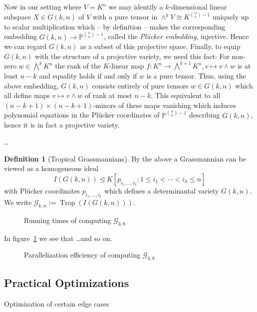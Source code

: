 \documentclass[
  paper=a4,
  DIV=14,
  fontsize=12pt,
  titlepage,
  bibliography=totoc,
  pagesize=pdftex
]{scrartcl}
\numberwithin{figure}{section}
\numberwithin{equation}{section}
\numberwithin{table}{section}
\newcommand*\setP{\mathds{P}}
\let\idealof\trianglelefteq
\DeclareMathOperator{\Trop}{Trop}
\theoremstyle{definition}
\newtheorem{definition}{Definition}
\numberwithin{definition}{section}
\begin{document}
Now in our setting where $V = K^n$ we may identify a $k$-dimensional linear subspace $X
\in G(k,n)$ of $V$ with a pure tensor in $\wedge^kV \cong K^{\binom nk-1}$ uniquely up to
scalar multiplication which -- by definition -- makes the corresponding embedding $G(k,n)
\to \setP^{\binom nk-1}$, called the \emph{Plücker embedding}, injective. Hence we can
regard $G(k,n)$ as a subset of this projective space. Finally, to equip $G(k,n)$ with the
structure of a projective variety, we need this fact: For non-zero $w\in \bigwedge^kK^n$
the rank of the $K$-linear map $f:K^n \to \bigwedge^{k+1}K^n, v \mapsto v \wedge w$ is at
least $n-k$ and equality holds if and only if $w$ is a pure tensor. Thus, using the above
embedding, $G(k,n)$ consists entirely of pure tensors $w\in G(k,n)$ which all define maps
$v\mapsto v\wedge w$ of rank at most $n-k$. This equivalent to all $(n-k+1)\times
(n-k+1)$-minors of these maps vanishing which induces polynomial equations in the Plücker
coordinates of $\setP^{\binom nk-1}$ describing $G(k,n)$, hence it is in fact a projective
variety.

\dots

\begin{definition}[Tropical Grassmannians]
  By the above a Grassmannian can be viewed as a homogeneous ideal
  \[
    I(G(k,n)) \idealof K[ p_{i_1, \dots, i_k} : 1\leq i_1 < \cdots < i_k \leq n ]
  \]
  with Plücker coordinates $p_{i_1,\dots,i_k}$ which defines a determinantal variety $G(k,
  n)$. We write $\mathcal G_{k,n} := \Trop(I(G(k,n)))$.
\end{definition}

\begin{figure}[htbp]
  \begin{center}
    
  \end{center}
  \caption{Running times of computing $\mathcal{G}_{3,8}$}
  \label{fig:g38scaling}
\end{figure}

In figure~\ref{fig:g38scaling} we see that \dots and so on.

\begin{figure}[htbp]
  \begin{center}
    
  \end{center}
  \caption{Parallelization efficiency of computing $\mathcal{G}_{3,8}$}
  \label{fig:g38efficiency}
\end{figure}

\subsection{Practical Optimizations}

Optimization of certain edge cases

\newpage
\listoffigures
\printbibliography
\end{document}
